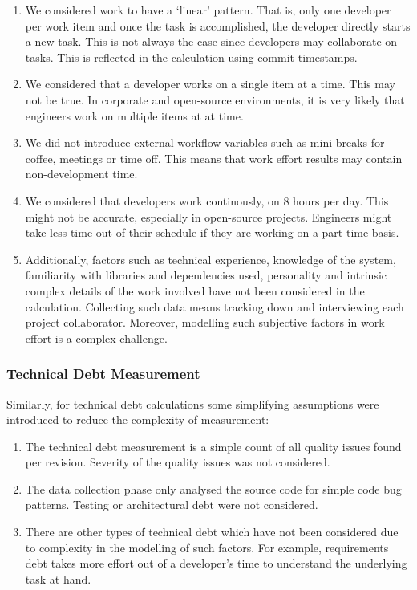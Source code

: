 \documentclass{mpaper}
\begin{document}
\begin{enumerate}
  \item We considered work to have a `linear' pattern. That is, only one
  developer per work item and once the task is accomplished, the developer
  directly starts a new task. This is not always the case since developers may
  collaborate on tasks. This is reflected in the calculation using commit
  timestamps. 
  \item We considered that a developer works on a single item at a time. This
  may not be true. In corporate and open-source environments, it is very likely
  that engineers work on multiple items at at time.  
  \item We did not introduce external workflow variables such as mini breaks for
  coffee, meetings or time off. This means that work effort results may contain
  non-development time. 
  \item We considered that developers work continously, on 8 hours per day. This
  might not be accurate, especially in open-source projects. Engineers might
  take less time out of their schedule if they are working on a part time basis.
  \item Additionally, factors such as technical experience, knowledge of the system,
  familiarity with libraries and dependencies used, personality and intrinsic
  complex details of the work involved have not been considered in the
  calculation. Collecting such data means tracking down and interviewing each
  project collaborator. Moreover, modelling such subjective factors in work effort
  is a complex challenge. 
\end{enumerate}

\subsubsection*{Technical Debt Measurement}
\label{validity-td}

Similarly, for technical debt calculations some simplifying assumptions were
introduced to reduce the complexity of measurement:

\begin{enumerate}
  \item The technical debt measurement is a simple count of all quality issues
  found per revision. Severity of the quality issues was not considered.
  \item The data collection phase only analysed the source code for simple code
  bug patterns. Testing or architectural debt were not considered. 
  \item There are other types of technical debt which have not been considered
  due to complexity in the modelling of such factors. For example, requirements
  debt takes more effort out of a developer's time to understand the underlying
  task at hand.
\end{enumerate}
\end{document}
